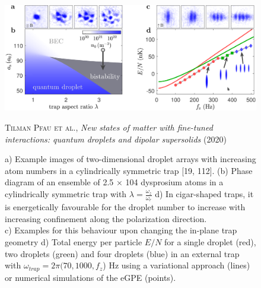 \begin{figure}[H]
    \centering
    \includegraphics[width=1.0\textwidth]{IMAGE/external_trap.png}\\
    \caption{
        a) Example images of two-dimensional droplet arrays with increasing
atom numbers in a cylindrically symmetric trap [19, 112]. (b) Phase diagram of an
ensemble of 2.5 × 104 dysprosium atoms in a cylindrically symmetric trap with $\lambda = \frac{\omega_{z}}{\omega_{r}}$
        d) In cigar-shaped traps, it is energetically favourable for the droplet number to increase with increasing confinement along the polarization direction. \\
        c) Examples for this behaviour upon changing the in-plane trap geometry
        d) Total energy per particle $E/N$ for a single droplet (red), two droplets (green) and four droplets (blue) in an external trap with $\omega_{trap} = 2\pi (70, 1000, f_{z}$) Hz using a variational approach (lines) or numerical simulations of the eGPE (points).
      }
    \textsc{Tilman Pfau et al.}, \emph{New states of matter with fine-tuned interactions: quantum droplets and dipolar supersolids} (2020)
    \label{fig:external_trap}
\end{figure}

